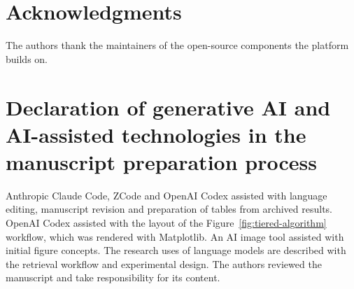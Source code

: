 \section*{Acknowledgments}
The authors thank the maintainers of the open-source components the platform
builds on. %

\section*{Declaration of generative AI and AI-assisted technologies in the manuscript preparation process}
Anthropic Claude Code, ZCode and OpenAI Codex assisted with language editing,
manuscript revision and preparation of tables from archived results.
OpenAI Codex assisted with the layout of the Figure~\ref{fig:tiered-algorithm}
workflow, which was rendered with Matplotlib. An AI image tool assisted
with initial figure concepts. The research uses of
language models are described with the retrieval workflow and experimental
design. The authors reviewed the manuscript and take responsibility for its
content.

